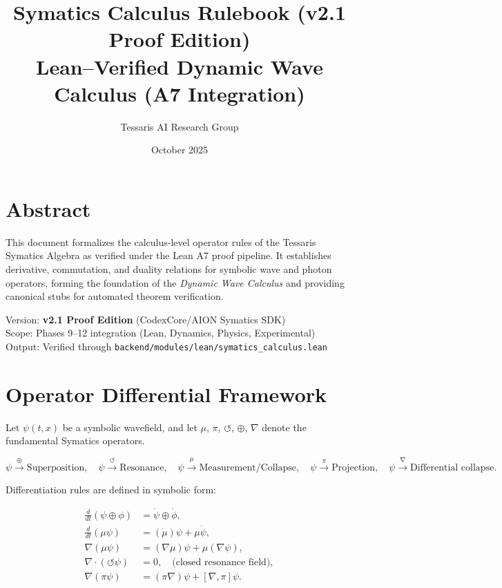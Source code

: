 \documentclass[12pt]{article}
\title{Symatics Calculus Rulebook (v2.1 Proof Edition)\\
\large Lean–Verified Dynamic Wave Calculus (A7 Integration)}
\author{Tessaris AI Research Group}
\date{October 2025}
\begin{document}
\maketitle

\section*{Abstract}

This document formalizes the calculus-level operator rules of the Tessaris Symatics Algebra as verified under the Lean A7 proof pipeline.
It establishes derivative, commutation, and duality relations for symbolic wave and photon operators, forming the foundation of the
\emph{Dynamic Wave Calculus} and providing canonical stubs for automated theorem verification.

\bigskip
\noindent
Version: \textbf{v2.1 Proof Edition} (CodexCore/AION Symatics SDK)\\
Scope: Phases 9--12 integration (Lean, Dynamics, Physics, Experimental)\\
Output: Verified through \texttt{backend/modules/lean/symatics\_calculus.lean}

\section{Operator Differential Framework}

Let $\psi(t,x)$ be a symbolic wavefield, and let $\mu$, $\pi$, $\circlearrowleft$, $\oplus$, $\nabla$ denote the fundamental Symatics operators.

\[
\psi \xrightarrow{\oplus} \text{Superposition}, \quad
\psi \xrightarrow{\circlearrowleft} \text{Resonance}, \quad
\psi \xrightarrow{\mu} \text{Measurement/Collapse}, \quad
\psi \xrightarrow{\pi} \text{Projection}, \quad
\psi \xrightarrow{\nabla} \text{Differential collapse}.
\]

Differentiation rules are defined in symbolic form:

\begin{align}
\frac{d}{dt}(\psi \oplus \phi) &= \dot{\psi} \oplus \dot{\phi}, \\
\frac{d}{dt}(\mu \psi) &= (\dot{\mu})\psi + \mu \dot{\psi}, \\
\nabla(\mu \psi) &= (\nabla \mu)\psi + \mu(\nabla \psi), \\
\nabla \cdot (\circlearrowleft \psi) &= 0, \quad \text{(closed resonance field)},\\
\nabla (\pi \psi) &= (\pi \nabla) \psi + [\nabla,\pi]\psi.
\end{align}
\end{document}
